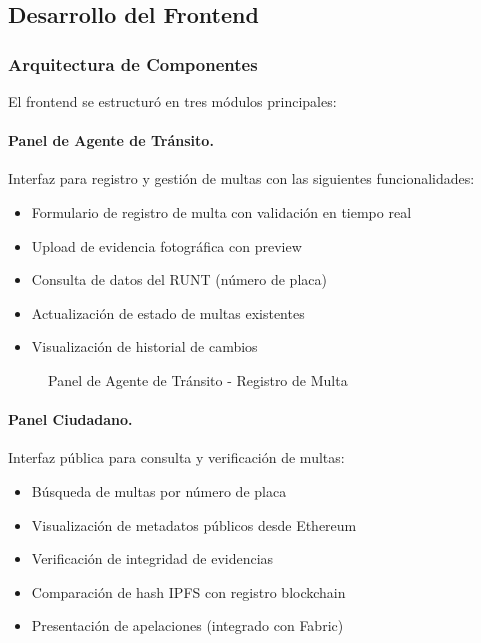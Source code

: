 \subsection{Desarrollo del Frontend}

\subsubsection{Arquitectura de Componentes}

El frontend se estructuró en tres módulos principales:

\paragraph{Panel de Agente de Tránsito.}
Interfaz para registro y gestión de multas con las siguientes funcionalidades:
\begin{itemize}
    \item Formulario de registro de multa con validación en tiempo real
    \item Upload de evidencia fotográfica con preview
    \item Consulta de datos del RUNT (número de placa)
    \item Actualización de estado de multas existentes
    \item Visualización de historial de cambios
\end{itemize}

\begin{figure}[htbp]
    \centering
    \caption{Panel de Agente de Tránsito - Registro de Multa}
    \label{fig:ui_panel_agente}
\end{figure}

\paragraph{Panel Ciudadano.}
Interfaz pública para consulta y verificación de multas:
\begin{itemize}
    \item Búsqueda de multas por número de placa
    \item Visualización de metadatos públicos desde Ethereum
    \item Verificación de integridad de evidencias
    \item Comparación de hash IPFS con registro blockchain
    \item Presentación de apelaciones (integrado con Fabric)
\end{itemize}

